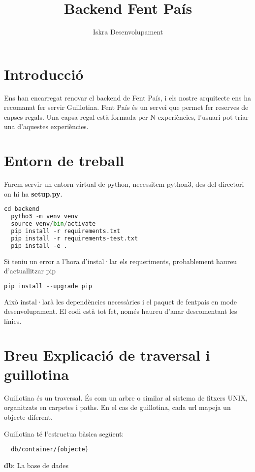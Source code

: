 \documentclass[a4paper, 11pt]{article}
\title{Backend Fent País}
\author{Iskra Desenvolupament}
\begin{document}
\maketitle
\tableofcontents

\section{Introducció}
Ens han encarregat renovar el backend de Fent País, i els nostre
arquitecte ens ha recomanat fer servir Guillotina. Fent País és un
servei que permet fer reserves de capses regals. Una capsa regal està
formada per N experiències, l'usuari pot triar una d'aquestes
experiències.

\section{Entorn de treball}
Farem servir un entorn virtual de python, necessitem python3, des del
directori on hi ha \textbf{setup.py}.

\begin{lstlisting}[language=Python, caption=Entorn virtual]
  cd backend
  pytho3 -m venv venv
  source venv/bin/activate
  pip install -r requirements.txt
  pip install -r requirements-test.txt
  pip install -e .
\end{lstlisting}
Si teniu un error a l'hora d'instal·lar els requeriments, probablement
haureu d'actuallitzar pip
\begin{lstlisting}[language=Python, caption=Entorn virtual]
  pip install --upgrade pip
\end{lstlisting}


Això instal·larà les dependències necessàries i el paquet de fentpais
en mode desenvolupament. El codi està tot fet, només haureu d'anar
descomentant les línies.

\section{Breu Explicació de traversal i guillotina}
Guillotina és un traversal. És com un arbre o similar al sistema de
fitxers UNIX, organitzats en carpetes i paths. En el cas de
guillotina, cada url mapeja un objecte diferent.

Guillotina té l'estructua bàsica següent:
\begin{lstlisting}
  db/container/{objecte}
\end{lstlisting}

\textbf{db}: La base de dades
\end{document}
